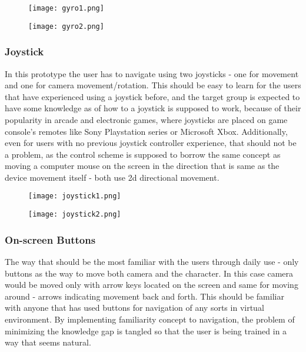 \begin{figure}[H]
\centering
\begin{minipage}{.5\textwidth}
  \centering
  \texttt{[image: gyro1.png]}
  \label{fig:test1}
\end{minipage}%
\begin{minipage}{.5\textwidth}
  \centering
  \texttt{[image: gyro2.png]}
  \label{fig:test2}
\end{minipage}
\end{figure}


\subsubsection{Joystick}
In this prototype the user has to navigate using two joysticks - one for movement and one for camera movement/rotation. This should be easy to learn for the users that have experienced using a joystick before, and the target group is expected to have some knowledge as of how to a joystick is supposed to work, because of their popularity in arcade and electronic games, where joysticks are placed on game console’s remotes like Sony Playstation series or Microsoft Xbox. Additionally, even for users with no previous joystick controller experience, that should not be a problem, as the control scheme is supposed to borrow the same concept as moving a computer mouse on the screen in the direction that is same as the device movement itself - both use 2d directional movement.

\begin{figure}[H]
\centering
\begin{minipage}{.5\textwidth}
  \centering
  \texttt{[image: joystick1.png]}
\end{minipage}%
\begin{minipage}{.5\textwidth}
  \centering
  \texttt{[image: joystick2.png]}
\end{minipage}
\end{figure}

\subsubsection{On-screen Buttons}
The way that should be the most familiar with the users through daily use - only buttons as the way to move both camera and the character. In this case camera would be moved only with arrow keys located on the screen and same for moving around - arrows indicating movement back and forth. This should be familiar with anyone that has used buttons for navigation of any sorts in virtual environment.
By implementing familiarity concept to navigation, the problem of minimizing the knowledge gap is tangled so that the user is being trained in a way that seems natural.

